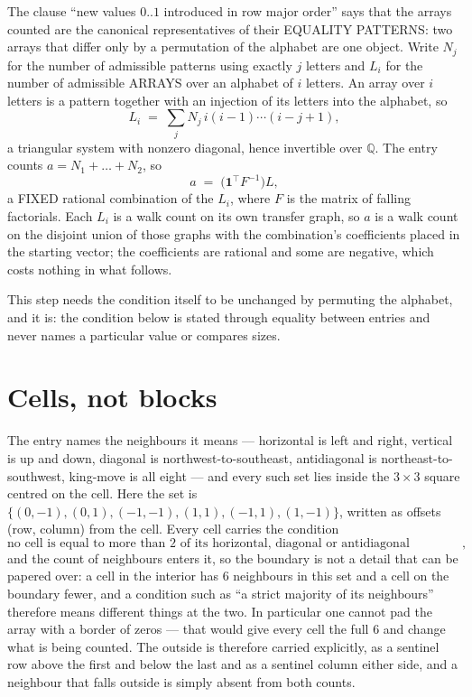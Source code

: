 \documentclass[11pt,a4paper]{article}
\theoremstyle{plain}
\theoremstyle{definition}
\begin{document}
The clause ``new values $0..1$ introduced in row major order'' says that the arrays
counted are the canonical representatives of their EQUALITY PATTERNS: two arrays that differ
only by a permutation of the alphabet are one object. Write $N_j$ for the number of admissible
patterns using exactly $j$ letters and $L_i$ for the number of admissible ARRAYS over an
alphabet of $i$ letters. An array over $i$ letters is a pattern together with an injection of
its letters into the alphabet, so
\[
L_i\;=\;\sum_{j}N_j\,i(i-1)\cdots(i-j+1),
\]
a triangular system with nonzero diagonal, hence invertible over $\mathbb{Q}$. The entry
counts $a=N_1+\dots+N_{2}$, so
\[
a\;=\;\bigl(\mathbf{1}^{\!\top}F^{-1}\bigr)L ,
\]
a FIXED rational combination of the $L_i$, where $F$ is the matrix of falling factorials.
Each $L_i$ is a walk count on its own transfer graph, so $a$ is a walk count on the disjoint
union of those graphs with the combination's coefficients placed in the starting vector; the
coefficients are rational and some are negative, which costs nothing in what follows.

This step needs the condition itself to be unchanged by permuting the alphabet, and it is:
the condition below is stated through equality between entries and never names a particular
value or compares sizes.

\section{Cells, not blocks}

The entry names the neighbours it means --- horizontal is left and right, vertical is up and
down, diagonal is northwest-to-southeast, antidiagonal is northeast-to-southwest, king-move is
all eight --- and every such set lies inside the $3\times3$ square centred on the cell. Here
the set is $\{(0,-1), (0,1), (-1,-1), (1,1), (-1,1), (1,-1)\}$, written as offsets (row, column) from the cell. Every cell carries
the condition
\[
\text{no cell is equal to more than 2 of its horizontal, diagonal or antidiagonal neighbours},
\]
and the count of neighbours enters it, so the boundary is not a detail that can be papered
over: a cell in the interior has $6$ neighbours in this set and a cell on the boundary
fewer, and a condition such as ``a strict majority of its neighbours'' therefore means
different things at the two. In particular one cannot pad the array with a border of zeros ---
that would give every cell the full $6$ and change what is being counted. The outside is
therefore carried
explicitly, as a sentinel row above the first and below the last and as a sentinel column
either side, and a neighbour that falls outside is simply absent from both counts.
\end{document}
